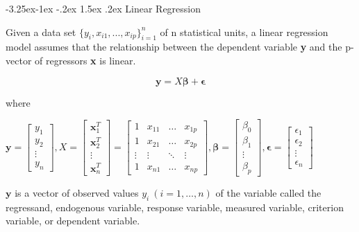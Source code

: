 \documentclass{article}
\makeatletter
\renewcommand\paragraph{\@startsection{paragraph}{4}{\z@}%
                                     {-3.25ex\@plus -1ex \@minus -.2ex}%
                                     {1.5ex \@plus .2ex}%
                                     {\normalfont\normalsize\bfseries}}
\makeatother
\begin{document}
\paragraph{Linear Regression}

Given a data set \(\{y_i, x_{i1}, ..., x_{ip}\}_{i=1}^n\) of n statistical units, a linear regression model assumes that the relationship between the dependent variable \textbf{y} and the p-vector of regressors \textbf{x} is linear.

\[\textbf{y} = X\boldsymbol{\beta} + \boldsymbol{\epsilon}\]

\noindent where

\bigskip

\(
\textbf{y} = 
\begin{bmatrix}
y_1\\
y_2\\
\vdots\\
y_n
\end{bmatrix}
,
X = 
\begin{bmatrix}
\textbf{x}_1^T\\
\textbf{x}_2^T\\
\vdots\\
\textbf{x}_n^T
\end{bmatrix} = 
\begin{bmatrix}
1 & x_{11} & \dots & x_{1p}\\
1 & x_{21} & \dots & x_{2p}\\
\vdots & \vdots & \ddots & \vdots\\
1 & x_{n1} & \dots & x_{np}
\end{bmatrix}
,
\boldsymbol{\beta} = 
\begin{bmatrix}
\beta_0\\
\beta_1\\
\vdots\\
\beta_p
\end{bmatrix}
,
\boldsymbol{\epsilon} = 
\begin{bmatrix}
\epsilon_1\\
\epsilon_2\\
\vdots\\
\epsilon_n
\end{bmatrix}
\)

\bigskip

\noindent \(\textbf{y}\) is a vector of observed values \(y_{i}\ (i=1,\ldots ,n)\) of the variable called the regressand, endogenous variable, response variable, measured variable, criterion variable, or dependent variable.

\bigskip
\end{document}
